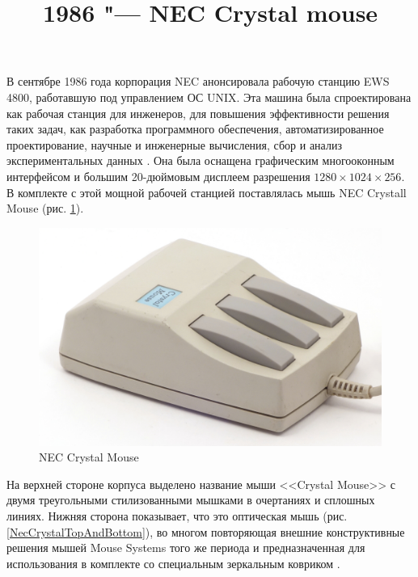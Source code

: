\documentclass[11pt, a4paper]{article}
\begin{document}
\title{1986 "--- NEC Crystal mouse}
\date{}
\maketitle
{}
В сентябре 1986 года корпорация NEC анонсировала рабочую станцию EWS 4800, работавшую под управлением ОС UNIX. Эта машина была спроектирована как рабочая станция для инженеров, для повышения эффективности решения таких задач, как разработка программного обеспечения, автоматизированное проектирование, научные и инженерные вычисления, сбор и анализ экспериментальных данных \cite{yt}. Она была оснащена графическим многооконным интерфейсом и большим 20-дюймовым дисплеем разрешения $1280 \times 1024 \times 256$. В комплекте с этой мощной рабочей станцией поставлялась мышь NEC Crystall Mouse (рис. \ref{fig:NECCrystalPic}).

\begin{figure}[h]
    \centering
    \includegraphics[scale=0.7]{1986_nec_crystal_mouse/necNorm_30.jpg}
    \caption{NEC Crystal Mouse}
    \label{fig:NECCrystalPic}
\end{figure}

На верхней стороне корпуса выделено название мыши <<Crystal Mouse>> с двумя треугольными стилизованными мышками в очертаниях и сплошных линиях. Нижняя сторона показывает, что это оптическая мышь (рис. \ref{NecCrystalTopAndBottom}), во многом повторяющая внешние конструктивные решения мышей Mouse Systems того же периода и предназначенная для использования в комплекте со специальным зеркальным ковриком \cite{photo}.
\end{document}

